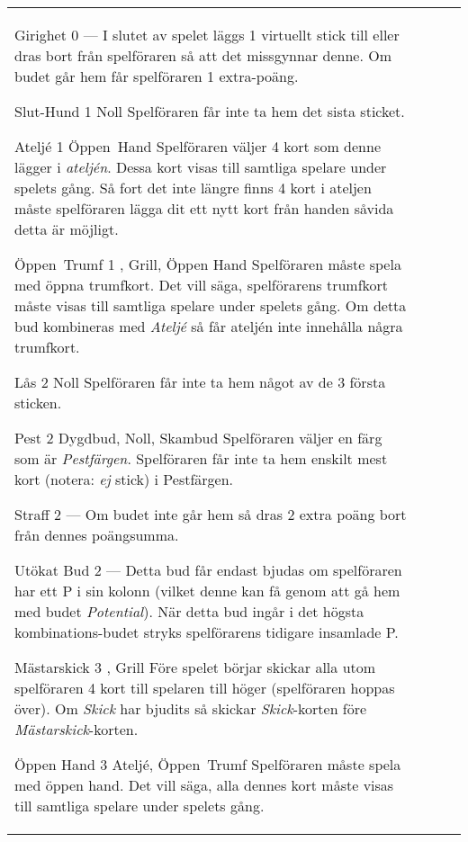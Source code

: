 \begin{table}
\begin{center}
\begin{tabularx}{\textwidth}{
			l
			S[table-number-alignment=center, table-figures-decimal=0]
			p{3cm}
			|X
		}
			\specialBidItem%
			{Girighet}
			{0}
			{---}
			{%
				I slutet av spelet läggs 1 virtuellt stick till eller dras bort från spelföraren så att det missgynnar denne. Om budet går hem får spelföraren 1 extra-poäng.
			}

			\specialBidItem%
			{Slut-Hund}
			{1}
			{Noll}
			{%
				Spelföraren får inte ta hem det sista sticket.
			}

			\specialBidItem%
			{Ateljé}
			{1}
			{Öppen~Hand}
			{%
				Spelföraren väljer 4 kort som denne lägger i \emph{ateljén}. Dessa kort visas till samtliga spelare under spelets gång. Så fort det inte längre finns 4 kort i ateljen måste spelföraren lägga dit ett nytt kort från handen såvida detta är möjligt.
			}

			\specialBidItem%
			{Öppen~Trumf}
			{1}
			{\nonTrump, Grill, Öppen Hand}
			{%
				Spelföraren måste spela med öppna trumfkort. Det vill säga, spelförarens trumfkort måste visas till samtliga spelare under spelets gång. Om detta bud kombineras med \emph{Ateljé} så får ateljén inte innehålla några trumfkort.
			}

			\specialBidItem%
			{Lås}
			{2}
			{Noll}
			{%
				Spelföraren får inte ta hem något av de 3 första sticken.
			}

			\specialBidItem%
			{Pest}
			{2}
			{Dygdbud, Noll, Skambud}
			{%
				Spelföraren väljer en färg som är \emph{Pestfärgen}. Spelföraren får inte ta hem enskilt mest kort (notera: \emph{ej} stick) i Pestfärgen.
			}

			\specialBidItem%
			{Straff}
			{2}
			{---}
			{%
				Om budet inte går hem så dras 2 extra poäng bort från dennes poängsumma.
			}

			\specialBidItem%
			{Utökat Bud}
			{2}
			{---}
			{%
				Detta bud får endast bjudas om spelföraren har ett P i sin kolonn (vilket denne kan få genom att gå hem med budet \emph{Potential}). När detta bud ingår i det högsta kombinations-budet stryks spelförarens tidigare insamlade P.
			}

			\specialBidItem%
			{Mästarskick}
			{3}
			{\nonTrump, Grill}
			{%
				Före spelet börjar skickar alla utom spelföraren 4 kort till spelaren till höger (spelföraren hoppas över). Om \emph{Skick} har bjudits så skickar \emph{Skick}-korten före \emph{Mästarskick}-korten.
			}

			\specialBidItem%
			{Öppen Hand}
			{3}
			{Ateljé, Öppen~Trumf}
			{%
				Spelföraren måste spela med öppen hand. Det vill säga, alla dennes kort måste visas till samtliga spelare under spelets gång.
			}
		\end{tabularx}
	\end{center}
\end{table}
